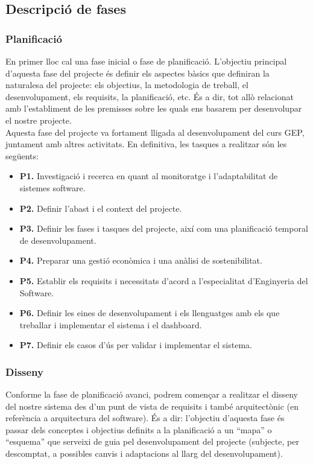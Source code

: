 \subsection{Descripció de fases}

\subsubsection{Planificació}

En primer lloc cal una fase inicial o fase de planificació. L’objectiu principal d’aquesta fase del projecte és definir els aspectes bàsics que definiran la naturalesa del projecte: els objectius, la metodologia de treball, el desenvolupament, els requisits, la planificació, etc. És a dir, tot allò relacionat amb l’establiment de les premisses sobre les quals ens basarem per desenvolupar el nostre projecte. \\

Aquesta fase del projecte va fortament lligada al desenvolupament del curs GEP, juntament amb altres activitats. En definitiva, les tasques a realitzar són les següents:

\begin{itemize}
\item \textbf{P1.} Investigació i recerca en quant al monitoratge i l’adaptabilitat de sistemes software.
\item \textbf{P2.} Definir l’abast i el context del projecte. 
\item \textbf{P3.} Definir les fases i tasques del projecte, així com una planificació temporal de desenvolupament.
\item \textbf{P4.} Preparar una gestió econòmica i una anàlisi de sostenibilitat.
\item \textbf{P5.} Establir els requisits i necessitats d’acord a l’especialitat d’Enginyeria del Software.
\item \textbf{P6.} Definir les eines de desenvolupament i els llenguatges amb els que treballar i implementar el sistema i el dashboard.
\item \textbf{P7.} Definir els casos d'ús per validar i implementar el sistema.
\end{itemize}

\subsubsection{Disseny}

Conforme la fase de planificació avanci, podrem començar a realitzar el disseny del nostre sistema des d’un punt de vista de requisits i també arquitectònic (en referència a arquitectura del software). És a dir: l’objectiu d’aquesta fase és passar dels conceptes i objectius definits a la planificació a un “mapa” o “esquema” que serveixi de guia pel desenvolupament del projecte (subjecte, per descomptat, a possibles canvis i adaptacions al llarg del desenvolupament). \\

